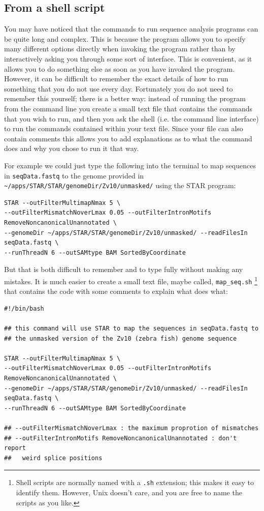 \documentclass[11pt]{article}
\begin{document}
\subsection{From a shell script}
\label{sec:orgheadline17}
You may have noticed that the commands to run sequence analysis programs can
be quite long and complex. This is because the program allows you to specify
many different options directly when invoking the program rather than by
interactively asking you through some sort of interface. This is convenient,
as it allows you to do something else as soon as you have invoked the
program. However, it can be difficult to remember the exact details of how to
run something that you do not use every day. Fortunately you do not need to
remember this yourself; there is a better way: instead of running the program
from the command line you create a small text file that contains the commands
that you wish to run, and then you ask the shell (i.e. the command line
interface) to run the commands contained within your text file. Since your
file can also contain comments this allows you to add explanations as to what
the command does and why you chose to run it that way.

For example we could just type the following into the terminal to map
sequences in \texttt{seqData.fastq} to the genome provided in
\texttt{\textasciitilde{}/apps/STAR/STAR/genomeDir/Zv10/unmasked/}
using the STAR program:

\begin{verbatim}
STAR --outFilterMultimapNmax 5 \
--outFilterMismatchNoverLmax 0.05 --outFilterIntronMotifs RemoveNoncanonicalUnannotated \
--genomeDir ~/apps/STAR/STAR/genomeDir/Zv10/unmasked/ --readFilesIn seqData.fastq \
--runThreadN 6 --outSAMtype BAM SortedByCoordinate
\end{verbatim}

But that is both difficult to remember and to type fully without
making any mistakes. It is much easier to create a small text file,
maybe called, \texttt{map\_seq.sh} \footnote{Shell scripts are normally named with a \texttt{.sh} extension; this
makes it easy to identify them. However, Unix doesn't care, and you
are free to name the scripts as you like.} that contains the code with some
comments to explain what does what:

\begin{verbatim}
#!/bin/bash

## this command will use STAR to map the sequences in seqData.fastq to
## the unmasked version of the Zv10 (zebra fish) genome sequence

STAR --outFilterMultimapNmax 5 \
--outFilterMismatchNoverLmax 0.05 --outFilterIntronMotifs RemoveNoncanonicalUnannotated \
--genomeDir ~/apps/STAR/STAR/genomeDir/Zv10/unmasked/ --readFilesIn seqData.fastq \
--runThreadN 6 --outSAMtype BAM SortedByCoordinate

## --outFilterMismatchNoverLmax : the maximum proprotion of mismatches
## --outFilterIntronMotifs RemoveNoncanonicalUnannotated : don't report 
##   weird splice positions
\end{verbatim}
\end{document}
